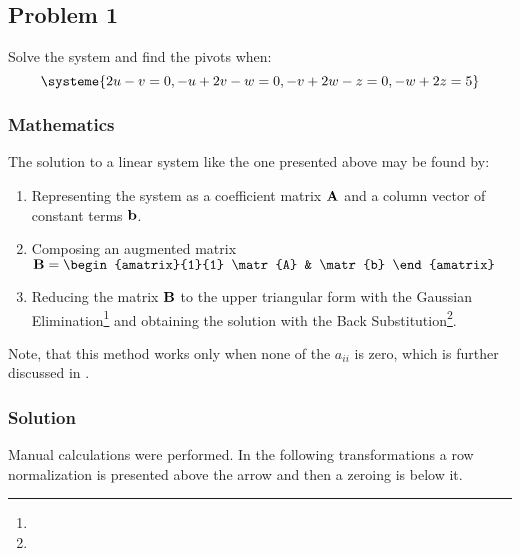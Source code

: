 \subsection{Problem 1}

Solve the system and find the pivots when:
\begin{equation*}
    \systeme{2u-v=0,-u+2v-w=0,-v+2w-z=0,-w+2z=5}
\end{equation*}

\subsubsection*{Mathematics}
The solution to a linear system like the one presented above may be found by:
\begin{enumerate}
  \item Representing the system as a coefficient matrix $\mathbf{A}$ and a column vector
    of constant terms $\mathbf{b}$.
  \item Composing an augmented matrix
    $\matr{B} = \begin{amatrix}{1}{1}
      \matr{A} & \matr{b}
    \end{amatrix}$
  \item Reducing the matrix $\mathbf{B}$ to the upper triangular form with the Gaussian
    Elimination\footnote{} and obtaining the solution with the Back
    Substitution\footnote{}.
\end{enumerate}

Note, that this method works only when none of the $a_{ii}$ is zero, which is further
discussed in .

\subsubsection*{Solution}

Manual calculations were performed. In the following transformations a row
normalization is presented above the arrow and then a zeroing is below it.

